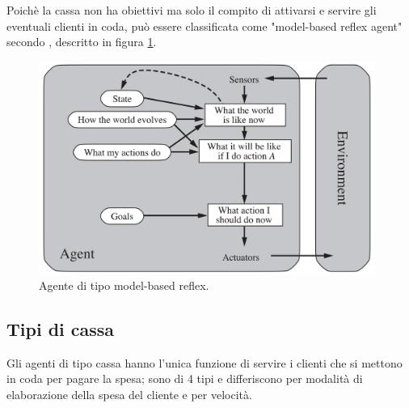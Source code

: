 Poichè la cassa non ha obiettivi ma solo il compito di attivarsi e servire gli eventuali clienti in coda, può essere classificata come "model-based reflex agent" secondo \cite{norvig}, descritto in figura \ref{fig:model-based}.

\begin{figure}[htp!]
	\centering
	\includegraphics[width=11cm]{"images/model-based-reflex_architecture.png"}
	\caption{Agente di tipo model-based reflex.}
	\label{fig:model-based}
\end{figure}

\subsection{Tipi di cassa}
\label{sec:tipi_cassa}

Gli agenti di tipo cassa hanno l'unica funzione di servire i clienti che si mettono in coda per pagare la spesa; sono di 4 tipi e differiscono per modalità di elaborazione della spesa del cliente e per velocità.

